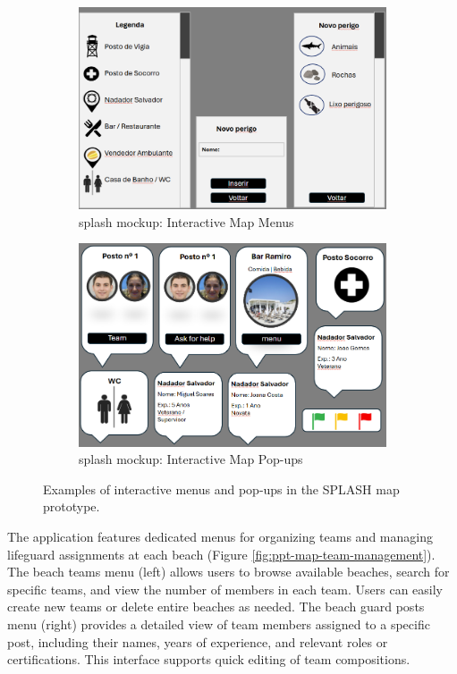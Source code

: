 \begin{figure}[H]
    \centering
    \begin{subfigure}{0.48\textwidth}
    \centering
    \includegraphics[width=\linewidth]{figs/Mockups/ppt-mockups-menus.png}
    \caption{\ac{splash} mockup: Interactive Map Menus}
    \label{fig:ppt-mockups-menus}
    \end{subfigure}
    \hfill
    \begin{subfigure}{0.48\textwidth}
    \centering
    \includegraphics[width=\linewidth]{figs/Mockups/ppt-mockups-popups.png}
    \caption{\ac{splash} mockup: Interactive Map Pop-ups}
    \label{fig:ppt-mockups-popups}
    \end{subfigure}
    \caption{Examples of interactive menus and pop-ups in the SPLASH map prototype.}
    \label{fig:ppt-map-menus-popups}
\end{figure}

The application features dedicated menus for organizing teams and managing lifeguard assignments at each beach (Figure \ref{fig:ppt-map-team-management}). The beach teams menu (left) allows users to browse available beaches, search for specific teams, and view the number of members in each team. Users can easily create new teams or delete entire beaches as needed. The beach guard posts menu (right) provides a detailed view of team members assigned to a specific post, including their names, years of experience, and relevant roles or certifications. This interface supports quick editing of team compositions.


